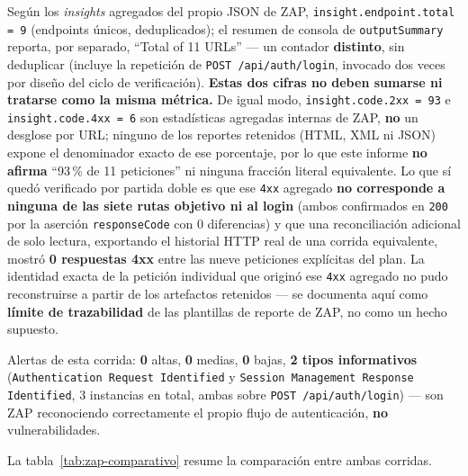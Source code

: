 Seg\'un los \emph{insights} agregados del propio JSON de ZAP,
\texttt{insight.endpoint.total = 9} (endpoints \'unicos, deduplicados);
el resumen de consola de \texttt{outputSummary} reporta, por separado,
``Total of 11 URLs'' --- un contador \textbf{distinto}, sin deduplicar
(incluye la repetici\'on de \texttt{POST~/api/auth/login}, invocado dos
veces por dise\~no del ciclo de verificaci\'on). \textbf{Estas dos cifras
no deben sumarse ni tratarse como la misma m\'etrica.} De igual modo,
\texttt{insight.code.2xx = 93} e \texttt{insight.code.4xx = 6} son
estad\'isticas agregadas internas de ZAP, \textbf{no} un desglose por
URL; ninguno de los reportes retenidos (HTML, XML ni JSON) expone el
denominador exacto de ese porcentaje, por lo que este informe
\textbf{no afirma} ``93\,\% de 11 peticiones'' ni ninguna fracci\'on
literal equivalente. Lo que s\'i qued\'o verificado por partida doble es
que ese \texttt{4xx} agregado \textbf{no corresponde a ninguna de las
siete rutas objetivo ni al login} (ambos confirmados en \texttt{200} por
la aserci\'on \texttt{responseCode} con 0 diferencias) y que una
reconciliaci\'on adicional de solo lectura, exportando el historial HTTP
real de una corrida equivalente, mostr\'o \textbf{0 respuestas 4xx} entre
las nueve peticiones expl\'icitas del plan. La identidad exacta de la
petici\'on individual que origin\'o ese \texttt{4xx} agregado no pudo
reconstruirse a partir de los artefactos retenidos --- se documenta aqu\'i
como \textbf{l\'imite de trazabilidad} de las plantillas de reporte de
ZAP, no como un hecho supuesto.

Alertas de esta corrida: \textbf{0} altas, \textbf{0} medias, \textbf{0}
bajas, \textbf{2 tipos informativos} (\texttt{Authentication Request
Identified} y \texttt{Session Management Response Identified}, 3
instancias en total, ambas sobre \texttt{POST~/api/auth/login}) --- son
ZAP reconociendo correctamente el propio flujo de autenticaci\'on, \textbf{no}
vulnerabilidades.

La tabla~\ref{tab:zap-comparativo} resume la comparaci\'on entre ambas
corridas.

